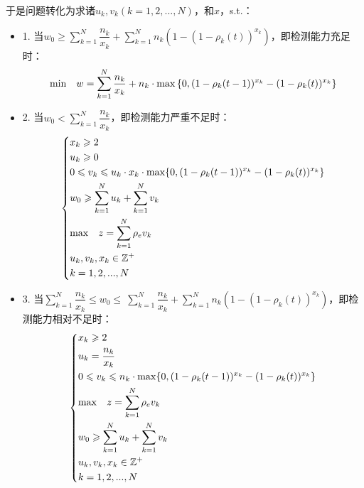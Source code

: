 \documentclass[withoutpreface,bwprint]{cumcmthesis} %
\begin{document}
于是问题转化为求诸$u_k,v_k(k=1,2,...,N)$，和$x$，s.t.：
\begin{itemize}
    \item{1.}
    当$w_0 \geqslant \sum\limits^N_{k=1}\dfrac{n_k}{x_k} + \sum\limits^N_{k=1}n_k  (1-(1-\rho_k(t))^{x_k})$，即检测能力充足时：
\begin{align}
\label{naive}
    {\rm min} \quad w= \sum^N_{k=1} \frac{n_k}{x_k}+ n_k\cdot {\rm max} \left\{0,(1-\rho_k(t-1))^{x_k}-(1-\rho_k(t))^{x_k}\right\}
\end{align}
    
    \item{2.}
当$w_0 < \sum\limits^N_{k=1}\dfrac{n_k}{x_k}$，即检测能力严重不足时：
\begin{align}
\label{eq2}
    \left\{
    \begin{aligned}
        &x_k \geqslant 2  \\
        &u_k \geqslant 0  \\
        &0\leqslant v_k \leqslant u_k \cdot x_k \cdot {\rm max} \{0,(1-\rho_k(t-1))^{x_k}-(1-\rho_k(t))^{x_k} \} \\
        &w_0 \geqslant \sum^N_{k=1} u_k +\sum^N_{k=1} v_k  \\
        &{\rm max} \quad z = \sum^N_{k=1}\rho_{e} v_k  \\
        &u_k,v_k,x_k\in\mathbb{Z^+}\\
        &k=1,2,...,N \\
    \end{aligned}
    \right.
\end{align}
    
    \item{3.}
        当$\sum\limits^N_{k=1}\dfrac{n_k}{x_k} \leqslant w_0 \leqslant\ \sum\limits^N_{k=1}\dfrac{n_k}{x_k} + \sum\limits^N_{k=1}n_k  (1-(1-\rho_k(t))^{x_k})$，即检测能力相对不足时：
\begin{align}
    \left\{
    \begin{aligned}
        &x_k \geqslant 2 \\
        &u_k =\frac{n_k}{x_k} \\
        &0 \leqslant v_k \leqslant  n_k \cdot {\rm max}
         \{0,(1-\rho_k(t-1))^{x_k}-(1-\rho_k(t))^{x_k} \} \\
        &{\rm max} \quad z = \sum^N_{k=1}\rho_e v_k  \\
        &w_0 \geqslant \sum^N_{k=1} u_k +\sum^N_{k=1} v_k  \\
        &u_k,v_k,x_k\in\mathbb{Z^+}\\
        &k=1,2,...,N \\
    \end{aligned}
    \right.
\end{align}

\end{itemize}
\end{document}
